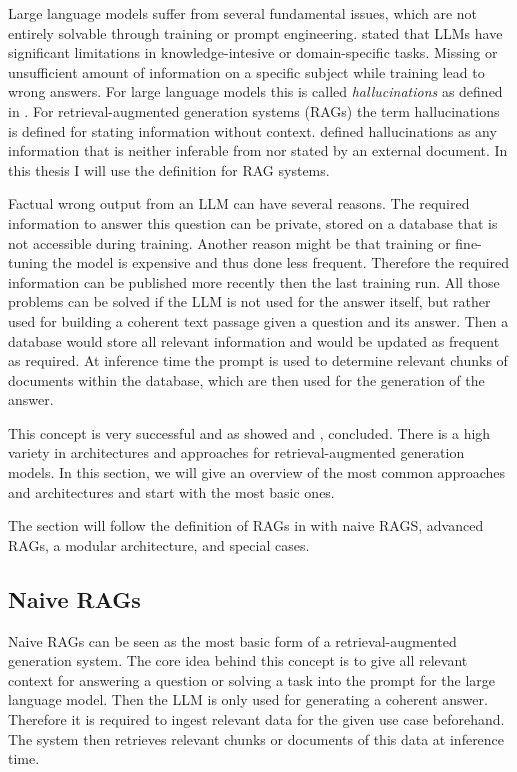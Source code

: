 Large language models suffer from several fundamental issues, which are not entirely solvable through training or prompt engineering. 
\cite{Gao.18.12.2023} stated that LLMs have significant limitations in knowledge-intesive or domain-specific tasks. Missing or unsufficient amount of information on a specific subject while training lead to wrong answers. For large language models this is called \textit{hallucinations} as defined in \cite{Huang.2023}. For retrieval-augmented generation systems (RAGs) the term hallucinations is defined for stating information without context. \cite{Rashkin.} defined hallucinations as any information that is neither inferable from nor stated by an external document. In this thesis I will use the definition for RAG systems. 

Factual wrong output from an LLM can have several reasons. The required information to answer this question can be private, stored on a database that is not accessible during training. Another reason might be that training or fine-tuning the model is expensive and thus done less frequent. Therefore the required information can be published more recently then the last training run. All those problems can be solved if the LLM is not used for the answer itself, but rather used for building a coherent text passage given a question and its answer. Then a database would store all relevant information and would be updated as frequent as required. At inference time the prompt is used to determine relevant chunks of documents within the database, which are then used for the generation of the answer.

This concept is very successful and as \cite{Shuster.} showed and \cite{Chen.2024}, \cite{Yu.2024} concluded. There is a high variety in architectures and approaches for retrieval-augmented generation models. In this section, we will give an overview of the most common approaches and architectures and start with the most basic ones.

The section will follow the definition of RAGs in \cite{Gao.18.12.2023} with naive RAGS, advanced RAGs, a modular architecture, and special cases. 

\subsection{Naive RAGs}
\label{sec:naive_rags}
Naive RAGs can be seen as the most basic form of a retrieval-augmented generation system. The core idea behind this concept is to give all relevant context for answering a question or solving a task into the prompt for the large language model. Then the LLM is only used for generating a coherent answer. Therefore it is required to ingest relevant data for the given use case beforehand. The system then retrieves relevant chunks or documents of this data at inference time. 


